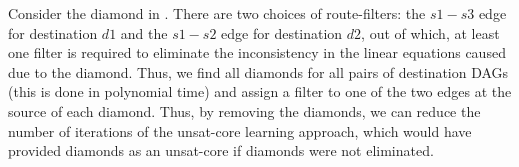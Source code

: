 Consider
the diamond in . There are two choices
of route-filters: the $s1-s3$ edge for destination $d1$ 
and the $s1-s2$ edge for destination $d2$, out of which,
at least one filter is required to eliminate the 
inconsistency in the linear equations caused due to the diamond.
Thus, we find all diamonds for all pairs of destination
DAGs (this is done in polynomial time) and assign a filter
to one of the two edges at the source of each diamond. 
Thus, by removing the diamonds, we can reduce the 
number of iterations
of the unsat-core learning approach, which would have 
provided diamonds as an unsat-core if 
diamonds were not eliminated.




